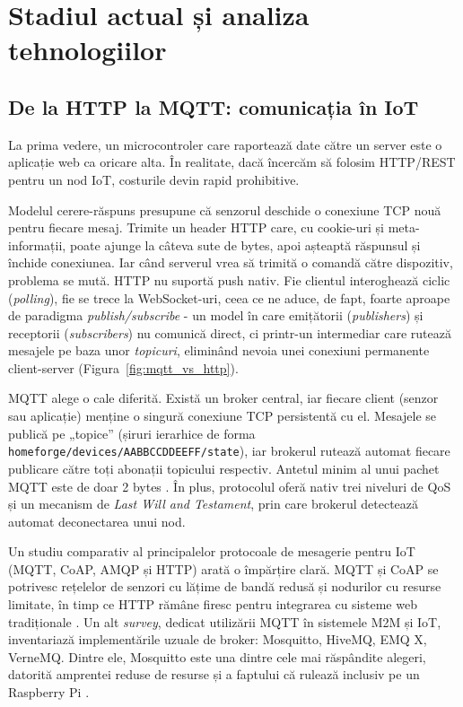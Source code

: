 \chapter{Stadiul actual și analiza tehnologiilor}

\section{De la HTTP la MQTT: comunicația în IoT}
La prima vedere, un microcontroler care raportează date către un server este o aplicație web ca oricare alta. În realitate, dacă încercăm să folosim HTTP/REST pentru un nod IoT, costurile devin rapid prohibitive.

Modelul cerere-răspuns presupune că senzorul deschide o conexiune TCP nouă pentru fiecare mesaj. Trimite un header HTTP care, cu cookie-uri și meta-informații, poate ajunge la câteva sute de bytes, apoi așteaptă răspunsul și închide conexiunea. Iar când serverul vrea să trimită o comandă către dispozitiv, problema se mută. HTTP nu suportă push nativ. Fie clientul interoghează ciclic (\textit{polling}), fie se trece la WebSocket-uri, ceea ce ne aduce, de fapt, foarte aproape de paradigma \textit{publish/subscribe} - un model în care emițătorii (\textit{publishers}) și receptorii (\textit{subscribers}) nu comunică direct, ci printr-un intermediar care rutează mesajele pe baza unor \textit{topicuri}, eliminând nevoia unei conexiuni permanente client-server (Figura~\ref{fig:mqtt_vs_http}).

MQTT alege o cale diferită. Există un broker central, iar fiecare client (senzor sau aplicație) menține o singură conexiune TCP persistentă cu el. Mesajele se publică pe „topice” (șiruri ierarhice de forma \texttt{homeforge/devices/AABBCCDDEEFF/state}), iar brokerul rutează automat fiecare publicare către toți abonații topicului respectiv. Antetul minim al unui pachet MQTT este de doar 2 bytes \cite{mqtt_standard_iot}. În plus, protocolul oferă nativ trei niveluri de QoS și un mecanism de \textit{Last Will and Testament}, prin care brokerul detectează automat deconectarea unui nod.

Un studiu comparativ al principalelor protocoale de mesagerie pentru IoT (MQTT, CoAP, AMQP și HTTP) arată o împărțire clară. MQTT și CoAP se potrivesc rețelelor de senzori cu lățime de bandă redusă și nodurilor cu resurse limitate, în timp ce HTTP rămâne firesc pentru integrarea cu sisteme web tradiționale \cite{mqtt_vs_http_iot_perf}. Un alt \textit{survey}, dedicat utilizării MQTT în sistemele M2M și IoT, inventariază implementările uzuale de broker: Mosquitto, HiveMQ, EMQ X, VerneMQ. Dintre ele, Mosquitto este una dintre cele mai răspândite alegeri, datorită amprentei reduse de resurse și a faptului că rulează inclusiv pe un Raspberry Pi \cite{mqtt_standard_iot}.

